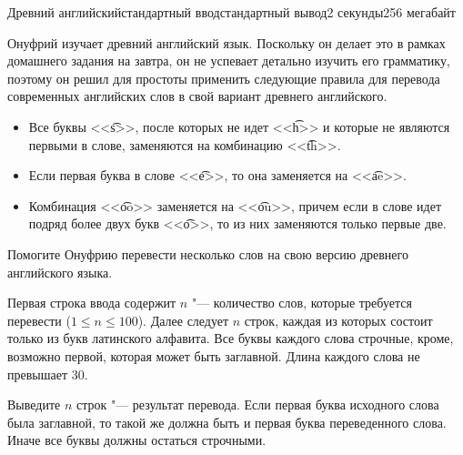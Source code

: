 \begin{problem}{Древний английский}{стандартный ввод}{стандартный вывод}{2 секунды}{256 мегабайт}

Онуфрий изучает древний английский язык. Поскольку он делает это в рамках домашнего задания
на завтра, он не успевает детально изучить его грамматику, поэтому он решил для простоты применить
следующие правила для перевода современных английских слов в свой вариант древнего английского.

\begin{itemize}
\item Все буквы <<\t{s}>>, после которых не идет <<\t{h}>> и которые не являются первыми в слове,
заменяются на комбинацию <<\t{th}>>.
\item Если первая буква в слове <<\t{e}>>, то она заменяется на <<\t{ae}>>.
\item Комбинация <<\t{oo}>> заменяется на <<\t{ou}>>, причем если в слове идет подряд
более двух букв <<\t{o}>>, то из них заменяются только первые две.
\end{itemize}

Помогите Онуфрию перевести несколько слов на свою версию древнего английского языка.

\InputFile
Первая строка ввода содержит $n$ "--- количество слов, которые требуется перевести ($1 \le n \le 100$).
Далее следует $n$ строк, каждая из которых состоит только из букв латинского алфавита.
Все буквы каждого слова строчные, кроме, возможно первой, которая может быть заглавной.
Длина каждого слова не превышает 30.

\OutputFile
Выведите $n$ строк "--- результат перевода. Если первая буква исходного слова была заглавной,
то такой же должна быть и первая буква переведенного слова. Иначе все буквы должны остаться
строчными.

\Example

\begin{example}%
%
\end{example}

\end{problem}
            